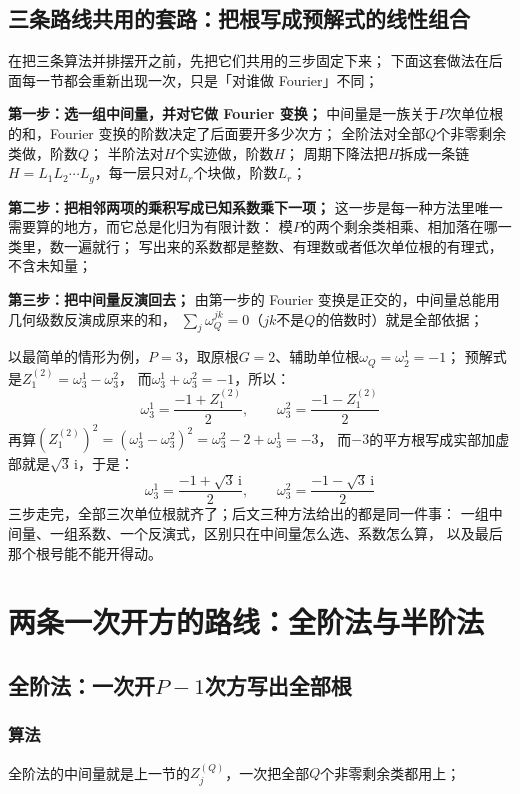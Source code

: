 \documentclass[UTF8,a4paper,11pt]{ctexart}
\newcommand{\ii}{\mathrm{i}}
\begin{document}
\subsection{三条路线共用的套路：把根写成预解式的线性组合}
在把三条算法并排摆开之前，先把它们共用的三步固定下来；
下面这套做法在后面每一节都会重新出现一次，只是「对谁做 Fourier」不同；\par

\textbf{第一步：选一组中间量，并对它做 Fourier 变换；}
中间量是一族关于$P$次单位根的和，Fourier 变换的阶数决定了后面要开多少次方；
全阶法对全部$Q$个非零剩余类做，阶数$Q$；
半阶法对$H$个实迹做，阶数$H$；
周期下降法把$H$拆成一条链$H=L_1L_2\cdots L_g$，每一层只对$L_r$个块做，阶数$L_r$；\par

\textbf{第二步：把相邻两项的乘积写成已知系数乘下一项；}
这一步是每一种方法里唯一需要算的地方，而它总是化归为有限计数：
模$P$的两个剩余类相乘、相加落在哪一类里，数一遍就行；
写出来的系数都是整数、有理数或者低次单位根的有理式，不含未知量；\par

\textbf{第三步：把中间量反演回去；}
由第一步的 Fourier 变换是正交的，中间量总能用几何级数反演成原来的和，
$\sum_j\omega_Q^{jk}=0$（$jk$不是$Q$的倍数时）就是全部依据；\par

以最简单的情形为例，$P=3$，取原根$G=2$、辅助单位根$\omega_Q=\omega_2^1=-1$；
预解式是$Z^{(2)}_1=\omega_3^1-\omega_3^2$，
而$\omega_3^1+\omega_3^2=-1$，所以：
\[
 \omega_3^1=\frac{-1+Z^{(2)}_1}{2},\qquad \omega_3^2=\frac{-1-Z^{(2)}_1}{2}
\]
再算$(Z^{(2)}_1)^2=(\omega_3^1-\omega_3^2)^2=\omega_3^2-2+\omega_3^1=-3$，
而$-3$的平方根写成实部加虚部就是$\sqrt3\,\ii$，于是：
\[
 \omega_3^1=\frac{-1+\sqrt3\,\ii}{2},\qquad \omega_3^2=\frac{-1-\sqrt3\,\ii}{2}
\]
三步走完，全部三次单位根就齐了；后文三种方法给出的都是同一件事：
一组中间量、一组系数、一个反演式，区别只在中间量怎么选、系数怎么算，
以及最后那个根号能不能开得动。
\pagebreak

\section{两条一次开方的路线：全阶法与半阶法}
\subsection{全阶法：一次开$P-1$次方写出全部根}
\subsubsection{算法}
全阶法的中间量就是上一节的$Z^{(Q)}_j$，一次把全部$Q$个非零剩余类都用上；
\end{document}
